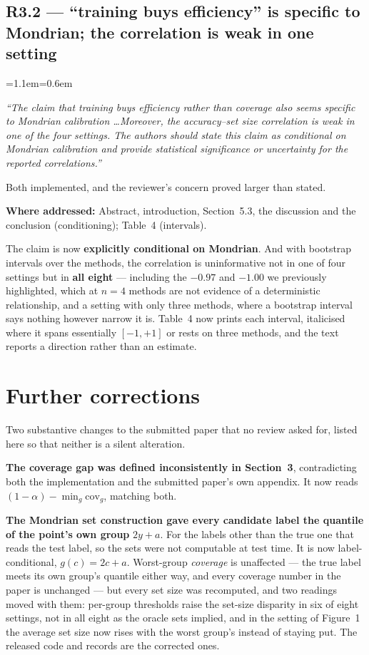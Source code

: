 \documentclass[11pt,a4paper]{article}
\newenvironment{reviewer}
  {\begin{list}{}{\leftmargin=1.1em\rightmargin=0.6em}\item[]\itshape\color{revgrey}\small}
  {\end{list}}
\newcommand{\where}[1]{{\textbf{Where addressed:} #1\par}}
\newcommand{\rpoint}[2]{\subsection*{#1 --- #2}}
\begin{document}
\rpoint{R3.2}{``training buys efficiency'' is specific to Mondrian; the correlation is weak in one
setting}

\begin{reviewer}
``The claim that training buys efficiency rather than coverage also seems specific to Mondrian
calibration \ldots Moreover, the accuracy--set size correlation is weak in one of the four settings.
The authors should state this claim as conditional on Mondrian calibration and provide statistical
significance or uncertainty for the reported correlations.''
\end{reviewer}

Both implemented, and the reviewer's concern proved larger than stated.

\where{Abstract, introduction, Section~5.3, the discussion and the conclusion (conditioning);
Table~4 (intervals).}

The claim is now \textbf{explicitly conditional on Mondrian}. And with bootstrap intervals over the
methods, the correlation is uninformative not in one of four settings but in \textbf{all eight}
--- including the $-0.97$ and $-1.00$ we previously highlighted, which at $n=4$ methods are not
evidence of a deterministic relationship, and a setting with only three methods, where a bootstrap
interval says nothing however narrow it is. Table~4 now prints each interval, italicised where it
spans essentially $[-1, +1]$ or rests on three methods, and the text reports a direction rather
than an estimate.

\section*{Further corrections}

Two substantive changes to the submitted paper that no review asked for, listed here so that
neither is a silent alteration.

\textbf{The coverage gap was defined inconsistently in Section~3}, contradicting both the
implementation and the submitted paper's own appendix. It now reads
$(1-\alpha) - \min_g \mathrm{cov}_g$, matching both.

\textbf{The Mondrian set construction gave every candidate label the quantile of the point's own
group} $2y+a$. For the labels other than the true one that reads the test label, so the sets were
not computable at test time. It is now label-conditional, $g(c)=2c+a$. Worst-group \emph{coverage}
is unaffected --- the true label meets its own group's quantile either way, and every coverage
number in the paper is unchanged --- but every set size was recomputed, and two readings moved with
them: per-group thresholds raise the set-size disparity in six of eight settings, not in all eight
as the oracle sets implied, and in the setting of Figure~1 the average set size now rises with the
worst group's instead of staying put. The released code and records are the corrected ones.
\end{document}
